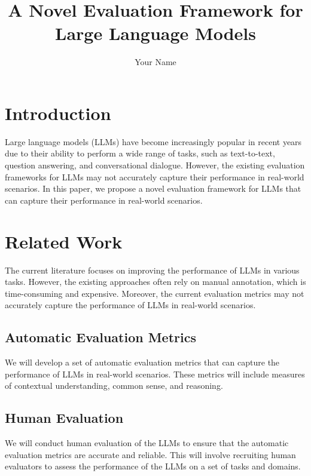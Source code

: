 \documentclass{article}
\begin{document}
\title{A Novel Evaluation Framework for Large Language Models}

\author{Your Name}

\maketitle

\section{Introduction}

Large language models (LLMs) have become increasingly popular in recent years due to their ability to perform a wide range of tasks, such as text-to-text, question answering, and conversational dialogue. However, the existing evaluation frameworks for LLMs may not accurately capture their performance in real-world scenarios. In this paper, we propose a novel evaluation framework for LLMs that can capture their performance in real-world scenarios.

\section{Related Work}

The current literature focuses on improving the performance of LLMs in various tasks. However, the existing approaches often rely on manual annotation, which is time-consuming and expensive. Moreover, the current evaluation metrics may not accurately capture the performance of LLMs in real-world scenarios.

\subsection{Automatic Evaluation Metrics}

We will develop a set of automatic evaluation metrics that can capture the performance of LLMs in real-world scenarios. These metrics will include measures of contextual understanding, common sense, and reasoning.

\subsection{Human Evaluation}

We will conduct human evaluation of the LLMs to ensure that the automatic evaluation metrics are accurate and reliable. This will involve recruiting human evaluators to assess the performance of the LLMs on a set of tasks and domains.
\end{document}
